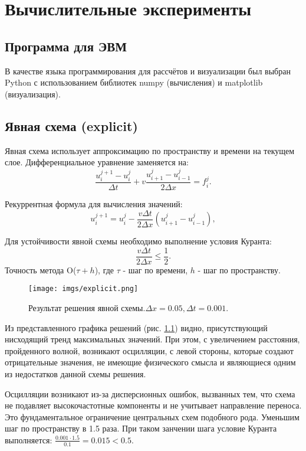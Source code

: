 \chapter{Вычислительные эксперименты}
\section{Программа для ЭВМ}
В качестве языка программирования для рассчётов и
визуализации был выбран Python с использованием библиотек numpy
(вычисления) и matplotlib (визуализация).
\section{Явная схема (explicit)}



Явная схема использует аппроксимацию по пространству и времени на текущем слое. Дифференциальное уравнение заменяется на:
$$
	\frac{u_i^{j+1} - u_i^j}{\Delta t} + v \frac{u_{i+1}^j - u_{i-1}^j}{2\Delta x} = f_{i}^{j}.
$$

Рекуррентная формула для вычисления значений:
$$
 u_i^{j+1} = u_i^j - \frac{v \Delta t}{2 \Delta x} \left( u_{i+1}^j - u_{i-1}^j \right),
$$

Для устойчивости явной схемы необходимо выполнение условия Куранта\cite{Turchak2003}:
\begin{equation}
	\boxed{\frac{v \Delta t}{2\Delta x} \leq \frac{1}{2}}.
	\label{eq:ust1}
\end{equation}
Точность метода O($\tau + h$), где $\tau$ - шаг по времени, $h$ - шаг по пространству.
\begin{figure}[h]  %
	\centering
	\texttt{[image: imgs/explicit.png]}  %
	\caption{Результат решения явной схемы.$\Delta x = 0.05, \Delta t = 0.001$.}  %
	\label{fig:explicit}  %
\end{figure}
\newline
 


Из представленного графика решений (рис. \ref{fig:explicit}) видно, присутствующий нисходящий тренд максимальных значений. При этом, с увеличением расстояния, пройденного волной, возникают осцилляции, с левой стороны, которые создают отрицательные значения, не имеющие физического смысла  и являющиеся одним из недостатков данной схемы решения.

Осцилляции возникают из-за дисперсионных ошибок, вызванных тем, что схема не подавляет высокочастотные компоненты и не учитывает направление переноса. Это фундаментальное ограничение центральных схем подобного рода.
\newpage
Уменьшим шаг по пространству в 1.5 раза. При таком занчении шага условие Куранта выполняется: $\frac{0.001 \cdot 1.5}{0.1} = 0.015< 0.5$.

